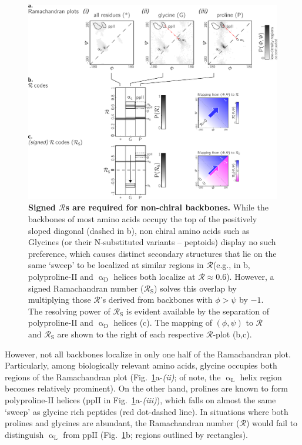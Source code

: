 \documentclass[fleqn,10pt,lineno]{wlpeerj} %
\newcommand{\Fig}[1]{Fig.~\ref{#1}}
\newcommand{\rr}{$\mathcal{R}$\xspace}
\begin{document}
\begin{figure}[t!]
\includegraphics[width=1.0\linewidth]{figures/signed4.pdf}
\caption{\textbf{Signed {\rr}s are required for non-chiral backbones.} While the backbones of most amino acids occupy the top of the positively sloped diagonal (dashed in b), non chiral amino acids such as Glycines (or their N-substituted variants -- peptoids) display no such preference, which causes distinct secondary structures that lie on the same `sweep' to be localized at similar regions in \rr (e.g., in b, polyproline-II and $\upalpha_\textrm{D}$ helices both localize at \rr $\approx 0.6$). However, a signed Ramachandran number ($\mathcal{R}_\textrm{S}$) solves this overlap by multiplying those \rr's derived from backbones with $\phi > \psi$ by $-1$. The resolving power of $\mathcal{R}_\textrm{S}$ is evident available by the separation of polyproline-II and $\upalpha_\textrm{D}$ helices (c). The mapping of $(\phi,\psi)$ to $\mathcal{R}$ and $\mathcal{R}_\textrm{S}$ are shown to the right of each respective \rr-plot (b,c).\label{fig:signed}} 
\end{figure}

However, not all backbones localize in only one half of the Ramachandran plot. Particularly, among biologically relevant amino acids, glycine occupies both regions of the Ramachandran plot (\Fig{fig:signed}a-{\it(ii)}; of note, the $\upalpha_\textrm{L}$ helix region becomes relatively prominent). On the other hand, prolines are known to form polyproline-II helices ($\textrm{ppII}$ in \Fig{fig:signed}a-{\it(iii)}), which falls on almost the same `sweep' as glycine rich peptides (red dot-dashed line). In situations where both prolines and glycines are abundant, the Ramachandran number (\rr) would fail to distinguish $\upalpha_\textrm{L}$ from $\textrm{ppII}$ (\Fig{fig:signed}b; regions outlined by rectangles).
\end{document}
